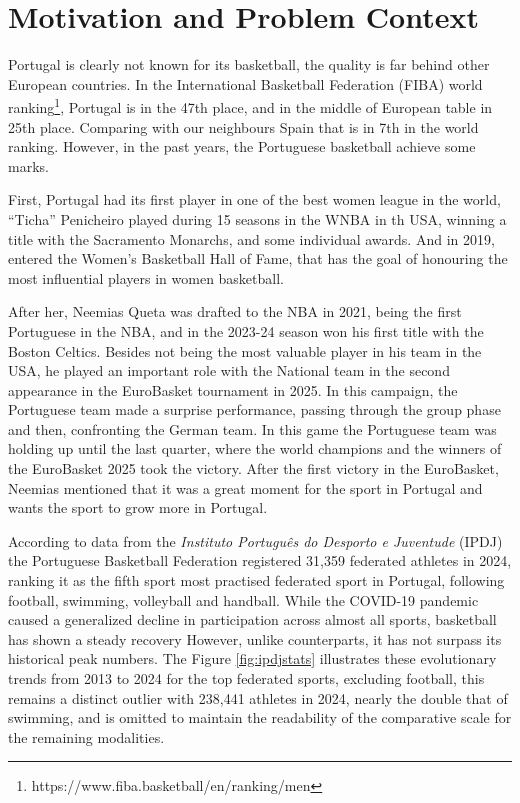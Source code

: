 \section{Motivation and Problem Context}
\label{sec:intro-motivation}
Portugal is clearly not known for its basketball, the quality is far behind other European countries.
In the International Basketball Federation (FIBA) world ranking\footnote{https://www.fiba.basketball/en/ranking/men}, Portugal is in the 47th place, and in the middle of European table in 25th place.
Comparing with our neighbours Spain that is in 7th in the world ranking.
However, in the past years, the Portuguese basketball achieve some marks.

First, Portugal had its first player in one of the best women league in the world, ``Ticha'' Penicheiro played during 15 seasons in the WNBA in th USA, winning a title with the Sacramento Monarchs, and some individual awards.
And in 2019, entered the Women’s Basketball Hall of Fame, that has the goal of honouring the most influential players in women basketball.\cite{ticha}

After her, Neemias Queta was drafted to the NBA in 2021, being the first Portuguese in the NBA, and in the 2023-24 season won his first title with the Boston Celtics.
Besides not being the most valuable player in his team in the USA, he played an important role with the National team in the second appearance in the EuroBasket tournament in 2025.
In this campaign, the Portuguese team made a surprise performance, passing through the group phase and then, confronting the German team.
In this game the Portuguese team was holding up until the last quarter, where the world champions and the winners of the EuroBasket 2025 took the victory.
After the first victory in the EuroBasket, Neemias mentioned that it was a great moment for the sport in Portugal and wants the sport to grow more in Portugal.\cite{neemias}

According to data from the \textit{Instituto Português do Desporto e Juventude} (IPDJ) the Portuguese Basketball Federation registered 31,359 federated athletes in 2024, ranking it as the fifth sport most practised federated sport in Portugal, following football, swimming, volleyball and handball\cite{ipdj2025stats}.
While the COVID-19 pandemic caused a generalized decline in participation across almost all sports, basketball has shown a steady recovery
However, unlike counterparts, it has not surpass its historical peak numbers.
The Figure \ref{fig:ipdjstats} illustrates these evolutionary trends from 2013 to 2024 for the top federated sports, excluding football, this remains a distinct outlier with 238,441 athletes in 2024, nearly the double that of swimming, and is omitted to maintain the readability of the comparative scale for the remaining modalities.

